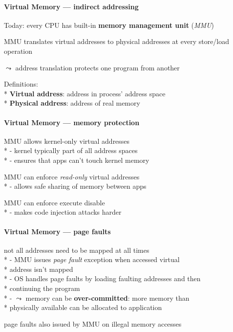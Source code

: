 \paragraph{Virtual Memory --- indirect addressing}
\begin{items}
	\item Today: every CPU has built-in \textbf{memory management unit} (\emph{MMU})
	\item MMU translates virtual addresses to physical addresses at every store/load operation
	\item \( \leadsto \) address translation protects one program from another
	\item Definitions:
		\\*
		\textbf{Virtual address}: address in process' address space
		\\*
		\textbf{Physical address}: address of real memory
\end{items}

\paragraph{Virtual Memory --- memory protection}
\begin{items}
	\item MMU allows kernel-only virtual addresses
		\\*
		- kernel typically part of all address spaces
		\\*
		- ensures that apps can't touch kernel memory
	\item MMU can enforce \emph{read-only} virtual addresses
		\\*
		- allows safe sharing of memory between apps
	\item MMU can enforce execute disable
		\\*
		- makes code injection attacks harder
\end{items}

\paragraph{Virtual Memory --- page faults}
\begin{items}
	\item not all addresses need to be mapped at all times
		\\*
		- MMU issues \emph{page fault} exception when accessed virtual \\* \phantom{-} address isn't mapped
		\\*
		- OS handles page faults by loading faulting addresses and then \\* \phantom{-} continuing the program
		\\*
		- \( \leadsto \) memory can be \textbf{over-committed}: more memory than \\* \phantom{-} physically available can be allocated to application
	\item page faults also issued by MMU on illegal memory accesses
\end{items}

